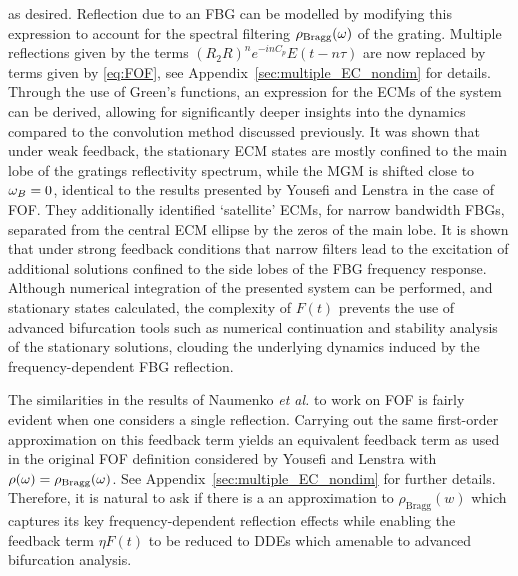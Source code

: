 %
as desired.
Reflection due to an FBG can be modelled by modifying this expression to account for the spectral filtering $\rho_{\text{Bragg}}(\omega)$ of the grating. 
Multiple reflections given by the terms $(R_2 R)^n e^{-i n C_p} E(t-n \tau)$ are now replaced by terms given by \eqref{eq:FOF}, see Appendix~\ref{sec:multiple_EC_nondim} for details. 
Through the use of Green's functions, an expression for the ECMs of the system can be derived, allowing for significantly deeper insights into the dynamics compared to the convolution method discussed previously. 
It was shown that under weak feedback, the stationary ECM states are mostly confined to the main lobe of the gratings reflectivity spectrum, while the MGM is shifted close to $\omega_B=0$, 
identical to the results presented by Yousefi and Lenstra in the case of FOF. 
They additionally identified `satellite' ECMs, for narrow bandwidth FBGs, separated from the central ECM ellipse by the zeros of the main lobe. 
It is shown that under strong feedback conditions that narrow filters lead to the excitation of additional solutions confined to the side lobes of the FBG frequency response. 
Although numerical integration of the presented system can be performed, and stationary states calculated, 
the complexity of $F(t)$ prevents the use of advanced bifurcation tools such as numerical continuation and stability analysis of the stationary solutions, clouding the underlying dynamics induced by the frequency-dependent FBG reflection. 
%
\par
%
The similarities in the results of Naumenko \textit{et al.} to work on FOF is fairly evident when one considers a single reflection. 
Carrying out the same first-order approximation on this feedback term yields an equivalent feedback term as used in the original FOF definition considered by Yousefi and Lenstra with $\rho(\omega) = \rho_\text{Bragg}(\omega)$. 
See Appendix~\ref{sec:multiple_EC_nondim} for further details. 
Therefore, it is natural to ask if there is a an approximation to $\rho_\text{Bragg}(w)$ which captures its key frequency-dependent reflection effects while enabling the feedback term $\eta F(t)$ to be reduced to DDEs which amenable to advanced bifurcation analysis.
